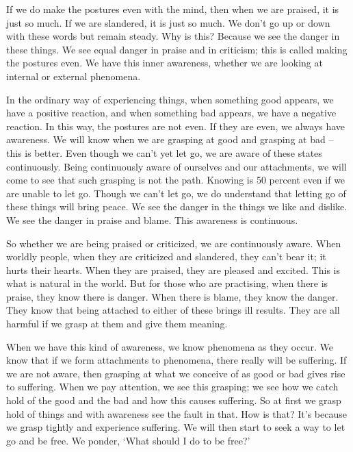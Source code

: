 If we do make the postures even with the mind, then when we are praised, it is just so much. If we are slandered, it is just so much. We don't go up or down with these words but remain steady. Why is this? Because we see the danger in these things. We see equal danger in praise and in criticism; this is called making the postures even. We have this inner awareness, whether we are looking at internal or external phenomena. 

In the ordinary way of experiencing things, when something good appears, we have a positive reaction, and when something bad appears, we have a negative reaction. In this way, the postures are not even. If they are even, we always have awareness. We will know when we are grasping at good and grasping at bad -- this is better. Even though we can't yet let go, we are aware of these states continuously. Being continuously aware of ourselves and our attachments, we will come to see that such grasping is not the path. Knowing is 50 percent even if we are unable to let go. Though we can't let go, we do understand that letting go of these things will bring peace. We see the danger in the things we like and dislike. We see the danger in praise and blame. This awareness is continuous. 

So whether we are being praised or criticized, we are continuously aware. When worldly people, when they are criticized and slandered, they can't bear it; it hurts their hearts. When they are praised, they are pleased and excited. This is what is natural in the world. But for those who are practising, when there is praise, they know there is danger. When there is blame, they know the danger. They know that being attached to either of these brings ill results. They are all harmful if we grasp at them and give them meaning. 

When we have this kind of awareness, we know phenomena as they occur. We know that if we form attachments to phenomena, there really will be suffering. If we are not aware, then grasping at what we conceive of as good or bad gives rise to suffering. When we pay attention, we see this grasping; we see how we catch hold of the good and the bad and how this causes suffering. So at first we grasp hold of things and with awareness see the fault in that. How is that? It's because we grasp tightly and experience suffering. We will then start to seek a way to let go and be free. We ponder, `What should I do to be free?'  


